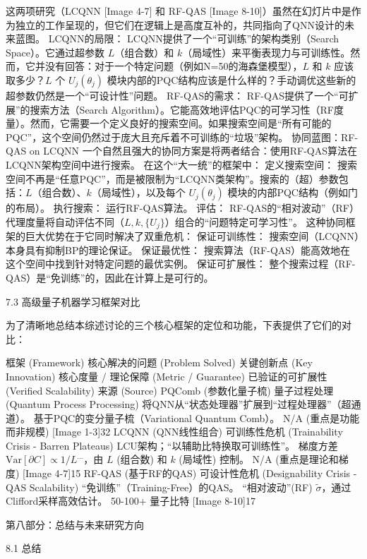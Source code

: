 \documentclass[12pt,a4paper]{article}
\begin{document}
这两项研究（LCQNN [Image 4-7] 和 RF-QAS [Image 8-10]）虽然在幻灯片中是作为独立的工作呈现的，但它们在逻辑上是高度互补的，共同指向了QNN设计的未来蓝图。
LCQNN的局限： LCQNN提供了一个“可训练”的架构类别（Search Space）。它通过超参数 $L$（组合数）和 $k$（局域性）来平衡表现力与可训练性。然而，它并没有回答：对于一个特定问题（例如N=50的海森堡模型），$L$ 和 $k$ 应该取多少？$L$ 个 $U_j(\theta_j)$ 模块内部的PQC结构应该是什么样的？手动调优这些新的超参数仍然是一个“可设计性”问题。
RF-QAS的需求： RF-QAS提供了一个“可扩展”的搜索方法（Search Algorithm）。它能高效地评估PQC的可学习性（RF度量）。然而，它需要一个定义良好的搜索空间。如果搜索空间是“所有可能的PQC”，这个空间仍然过于庞大且充斥着不可训练的“垃圾”架构。
协同蓝图：RF-QAS on LCQNN
一个自然且强大的协同方案是将两者结合：使用RF-QAS算法在LCQNN架构空间中进行搜索。
在这个“大一统”的框架中：
定义搜索空间： 搜索空间不再是“任意PQC”，而是被限制为“LCQNN类架构”。搜索的（超）参数包括：$L$（组合数）、$k$（局域性），以及每个 $U_j(\theta_j)$ 模块的内部PQC结构（例如门的布局）。
执行搜索： 运行RF-QAS算法。
评估： RF-QAS的“相对波动”（RF）代理度量将自动评估不同（$L, k, \{U_j\}$）组合的“问题特定可学习性”。
这种协同框架的巨大优势在于它同时解决了双重危机：
保证可训练性： 搜索空间（LCQNN）本身具有抑制BP的理论保证。
保证最优性： 搜索算法（RF-QAS）能高效地在
这个空间中找到针对特定问题的最优实例。
保证可扩展性： 整个搜索过程（RF-QAS）是“免训练”的，因此在计算上是可行的。

7.3 高级量子机器学习框架对比

为了清晰地总结本综述讨论的三个核心框架的定位和功能，下表提供了它们的对比：

框架 (Framework)
核心解决的问题 (Problem Solved)
关键创新点 (Key Innovation)
核心度量 / 理论保障 (Metric / Guarantee)
已验证的可扩展性 (Verified Scalability)
来源 (Source)
PQComb (参数化量子梳)
量子过程处理 (Quantum Process Processing)
将QNN从“状态处理器”扩展到“过程处理器”（超通道）。
基于PQC的变分量子梳（Variational Quantum Comb）。
N/A (重点是功能而非规模)
[Image 1-3]32
LCQNN (QNN线性组合)
可训练性危机 (Trainability Crisis - Barren Plateaus)
LCU架构；“以辅助比特换取可训练性”。
梯度方差 $\text{Var}[\partial C] \propto 1/L^{...}$，由 $L$ (组合数) 和 $k$ (局域性) 控制。
N/A (重点是理论和梯度)
[Image 4-7]15
RF-QAS (基于RF的QAS)
可设计性危机 (Designability Crisis - QAS Scalability)
“免训练”（Training-Free）的QAS。
“相对波动”(RF) $\tilde{\sigma}$，通过Clifford采样高效估计。
50-100+ 量子比特
[Image 8-10]17


第八部分：总结与未来研究方向


8.1 总结
\end{document}

